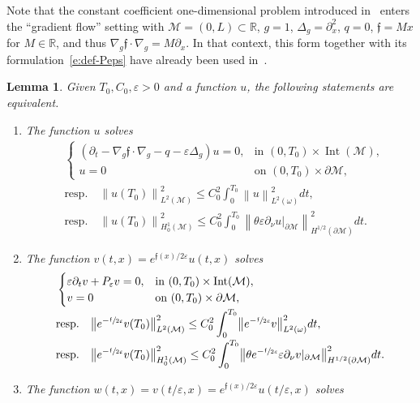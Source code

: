 \documentclass[10pt]{amsart}
\newtheorem{lemma}{Lemma}[section]
\theoremstyle{definition}
\newcommand{\M}{\ensuremath{\mathcal M}}
\newcommand{\mb}[1]{\ensuremath{\mathbb{#1}}}
\newcommand{\R}{{\mb{R}}}
\newcommand{\f}{\ensuremath{\mathfrak{f}}}
\DeclareMathOperator{\Int}{Int}
\newcommand\Lap{\Delta_{g}}
\newcommand\nablag{\nabla_{g}}
\newcommand\nor[2]{\left\|#1\right\|_{#2}}
\newcommand\bnor[2]{\bigl\|#1\bigr\|_{#2}}
\let\d\partial
\let\eps\varepsilon
\let\q q
\providecommand{\resp}{resp.}\providecommand{\cf}{cf.}
\begin{document}
Note that the constant coefficient one-dimensional problem introduced in~\cite{CG:05} enters the ``gradient flow'' setting with $\M =(0,L)\subset \R$, $g=1$, $\Lap=\d_x^2$, $\q=0$, $\f = M x$ for $M\in \R$, and thus $\nablag \f \cdot \nablag = M \d_x$. In that context, this form together with its formulation~\eqref{e:def-Peps} have already been used in~\cite{CG:05,Gla:10,Lissy:14,Lissy:15}.
\begin{lemma}
\label{lemequiveunif}
Given $T_0, C_0, \eps >0$ and a function $u$, the following statements are equivalent.
\begin{enumerate}
\item The function $u$ solves
\begin{align}
\label{e:heat-transp-eps}
&\begin{cases}
(\d_t - \nablag \f\cdot \nablag -\q - \eps \Delta_g ) u = 0, & \text{in } (0,T_0)\times\Int(\M), \\
u = 0 & \text{on } (0,T_0)\times \d\M,
\end{cases}
\\
\label{e:obs-heat-transp-eps}
&\text{\resp }\quad \nor{u(T_0)}{L^2(\M)}^2 \leq C_0^2\int_0^{T_0}\nor{u}{L^2(\omega)}^2 dt, \\
\label{e:obs-heat-transp-epsboundary}
&\text{\resp }\quad \nor{u(T_0)}{H^1_0(\M)}^2 \leq C_0^2\int_0^{T_0}\nor{\theta \eps \partial_{\nu}u|_{\d\M}}{H^{1/2}(\d\M)}^2 dt.
\end{align}
\item The function $v(t,x)= e^{\f(x)/2\eps}u(t,x)$ solves
\begin{align}
\label{e:heat-transp-eps-Witt}
&\begin{cases}
\eps \partial_t v + P_\eps v =0, & \text{in } (0,T_0)\times\Int(\M), \\
v = 0 & \text{on } (0,T_0)\times \d\M,
\end{cases}
\\[-2pt]
\label{e:obs-heat-transp-eps-Witt}
&\text{\resp }\quad \bnor{e^{-\sfrac{\f}{2\eps}}v(T_0)}{L^2(\M)}^2 \leq C_0^2\int_0^{T_0}\bnor{e^{-\sfrac{\f}{2\eps}}v }{L^2(\omega)}^2 dt, \\[-2pt]
\label{e:obs-heat-transp-eps-Wittboundary}
&\text{\resp }\quad \bnor{e^{-\sfrac{\f}{2\eps}}v(T_0)}{H^1_0(\M)}^2 \leq C_0^2\int_0^{T_0}\bnor{\theta e^{-\sfrac{\f}{2\eps}} \eps \partial_{\nu}v|_{\d\M} }{H^{1/2}(\d\M)}^2 dt.
\end{align}
\item The function $w(t,x) = v(t/\eps, x)= e^{\f(x)/2\eps}u(t/\eps,x)$ solves
\begin{align}

\end{align}
\end{enumerate}
\end{lemma}
\end{document}
